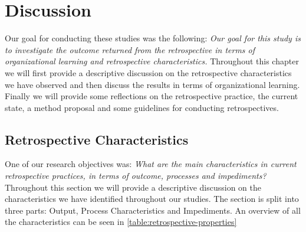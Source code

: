 \chapter{Discussion}
Our goal for conducting these studies was the following: \textit{Our goal for this study is to investigate the outcome returned from the retrospective in terms of organizational learning and retrospective characteristics.} Throughout this chapter we will first provide a descriptive discussion on the retrospective characteristics we have observed and then discuss the results in terms of organizational learning. Finally we will provide some reflections on the retrospective practice, the current state, a method proposal and some guidelines for conducting retrospectives.

\section{Retrospective Characteristics}
One of our research objectives was: \textit{What are the main characteristics in current retrospective practices, in
terms of outcome, processes and impediments?} Throughout this section we will provide a descriptive discussion on the characteristics we have identified throughout our studies. The section is split into three parts: Output, Process Characteristics and Impediments. An overview of all the characteristics can be seen in \autoref{table:retrospective-properties}

